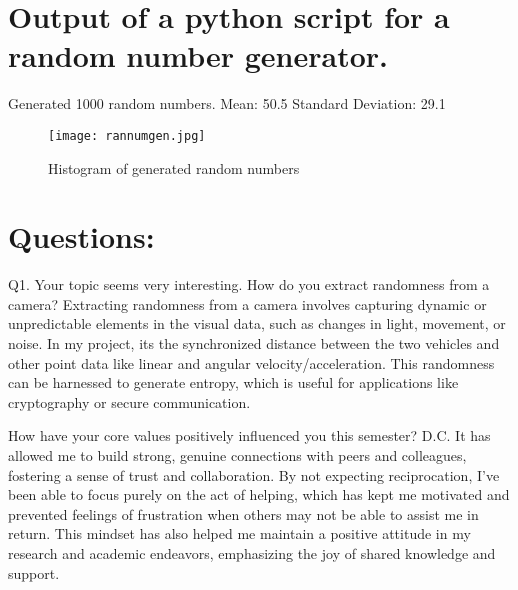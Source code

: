\documentclass{article}
\begin{document}
\section{Output of a python script for a random number generator.}
Generated 1000 random numbers.
Mean: 50.5
Standard Deviation: 29.1
\begin{figure}[ht]
    \centering
    \texttt{[image: rannumgen.jpg]}
    \caption{Histogram of generated random numbers}
    \label{fig: rannumgen.jpg}
\end{figure}


\section*{Questions: }

Q1. Your topic seems very interesting. How do you extract randomness from a camera?
Extracting randomness from a camera involves capturing dynamic or unpredictable elements in the visual data, such as changes in light, movement, or noise. In my project, its the synchronized distance between the two vehicles and other point data like linear and angular velocity/acceleration. This randomness can be harnessed to generate entropy, which is useful for applications like cryptography or secure communication.

How have your core values positively influenced you this semester? D.C.
It has allowed me to build strong, genuine connections with peers and colleagues, fostering a sense of trust and collaboration. By not expecting reciprocation, I’ve been able to focus purely on the act of helping, which has kept me motivated and prevented feelings of frustration when others may not be able to assist me in return. This mindset has also helped me maintain a positive attitude in my research and academic endeavors, emphasizing the joy of shared knowledge and support.
\end{document}
